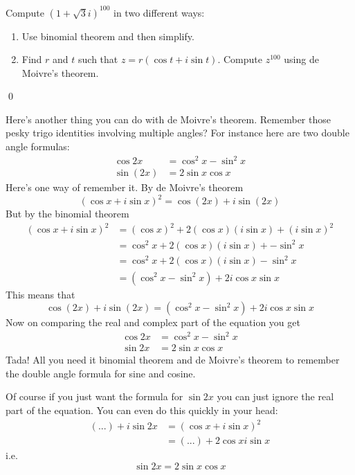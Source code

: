 \begin{ex}
Compute $(1 + \sqrt{3}i)^{100}$ in two different ways:
\begin{enumerate}[nosep,label=(\alph*)]
\item Use binomial theorem and then simplify.
\item Find $r$ and $t$ such that 
$z = r(\cos t + i \sin t)$. Compute $z^{100}$ using de Moivre's theorem.
\end{enumerate}
\qed
\end{ex}

Here's another thing you can do with de Moivre's theorem.
Remember those pesky trigo identities involving multiple angles?
For instance here are two double angle formulas:
\begin{align*}
  \cos 2x &= \cos^2 x - \sin^2 x \\
  \sin(2x) &= 2 \sin x \cos x
\end{align*}
Here's one way of remember it.
By de Moivre's theorem
\[
(\cos x + i \sin x)^2 = \cos (2x) + i \sin (2x)
\]
But by the binomial theorem
\begin{align*}
(\cos x + i \sin x)^2 
&= (\cos x)^2 + 2 (\cos x)(i \sin x) + (i \sin x)^2 \\
&= \cos^2 x + 2 (\cos x)(i \sin x) + - \sin^2 x \\
&= \cos^2 x + 2 (\cos x)(i \sin x) - \sin^2 x \\
&= (\cos^2 x - \sin^2 x) + 2 i \cos x \sin x
\end{align*}
This means that
\[
\cos (2x) + i \sin (2x)
= (\cos^2 x - \sin^2 x) + 2 i \cos x \sin x 
\]
Now on comparing the real and complex part of the equation you get
\begin{align*}
\cos 2x &= \cos^2 x - \sin^2 x \\
\sin 2x &= 2 \sin x \cos x 
\end{align*}
Tada!
All you need it binomial theorem and de Moivre's theorem
to remember the double angle formula for sine and cosine.

Of course if you just want the formula for $\sin 2x$ you can 
just ignore the real part of the equation.
You can even do this quickly in your head:
\begin{align*}
(...) + i \sin 2x 
&= (\cos x + i \sin x)^2 \\
&= (...) + 2 \cos x i \sin x
\end{align*}
i.e.
\[
\sin 2x = 2 \sin x \cos x
\]

